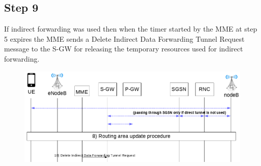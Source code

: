 \subsection*{Step 9}
If indirect forwarding was used then when the timer started by the MME at step 5
expires the MME sends a Delete Indirect Data Forwarding Tunnel Request message
to the S-GW for releasing the temporary resources used for indirect forwarding.
\begin{figure}[!htb]
	\centering
	\includegraphics[width=0.9\linewidth]{img/execution-9.png}
	\label{fig:exec-9}
\end{figure}
